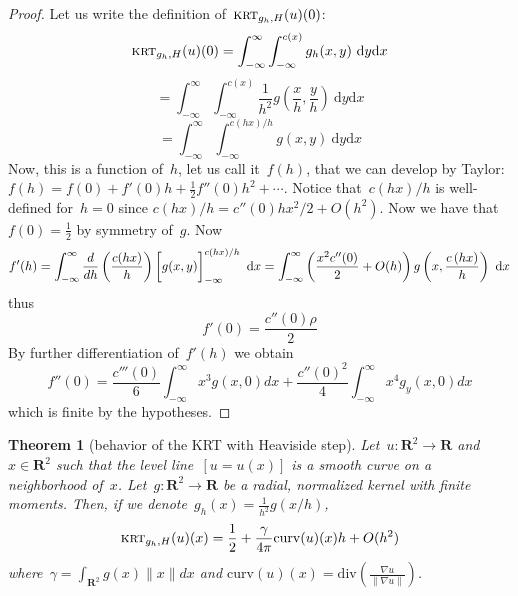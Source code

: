 \documentclass[12pt]{article}                  %
\newtheorem{theorem}{Theorem}
\begin{document}
\begin{proof}
	Let us write the definition of~$\textsc{krt}_{g_h,H}(u)(0)$:
	\[
		\textsc{krt}_{g_h,H}(u)(0)=
		\int_{-\infty}^\infty\int_{-\infty}^{c(x)}
		g_h(x,y)\ %
		\mathrm{d}y
		\mathrm{d}x
	\]
	\[
		=
		\int_{-\infty}^\infty\int_{-\infty}^{c(x)}
		\frac1{h^2}g\left(\frac{x}{h},\frac{y}{h}\right)\ %
		\mathrm{d}y
		\mathrm{d}x
	\]
	\[
		=
		\int_{-\infty}^\infty\int_{-\infty}^{c\left(hx\right)/h}
		g\left(x,y\right)\ %
		\mathrm{d}y
		\mathrm{d}x
	\]
	Now, this is a function of~$h$, let us call it~$f(h)$, that we can
	develop by Taylor:~$f(h)=f(0)+f'(0)h+\frac12f''(0)h^2+\cdots$.
	Notice that~$c(hx)/h$ is well-defined for~$h=0$ since
	$c(hx)/h=c''(0)hx^2/2+O(h^2)$.
	Now we have that~$f(0)=\frac12$ by symmetry of~$g$.  Now
	\[
		f'(h)=
		\int_{-\infty}^\infty \frac{d}{d h}\left(\frac{c(hx)}h\right)
		\left[\vphantom{\int}g(x,y)\right]_{-\infty}^{c(hx)/h}
		\ \mathrm{d}x
		=
		\int_{-\infty}^\infty \left(\frac{x^2c''(0)}2+O(h)\right)
		g\left(x,\frac{c\left(hx\right)}h\right)
		\ \mathrm{d}x
	\]
	thus
	\[
		f'(0)=\frac{c''(0)\rho}2
	\]
	By further differentiation of~$f'(h)$ we obtain
	\[
		f''(0)=
		\frac{c'''(0)}6\int_{-\infty}^\infty x^3g(x,0)dx
		+
		\frac{c''(0)^2}4\int_{-\infty}^\infty x^4g_y(x,0)dx
	\]
	which is finite by the hypotheses.
\end{proof}


\clearpage
\begin{theorem}[behavior of the KRT with Heaviside step]
	\label{thm:krtheaviside}
	Let~$u:\mathbf{R}^2\to\mathbf{R}$ and~$x\in\mathbf{R}^2$ such that
	the level line~$[u=u(x)]$ is a smooth curve on a neighborhood
	of~$x$.  Let~$g:\mathbf{R}^2\to\mathbf{R}$ be a radial,
	normalized kernel with
	finite moments.  Then, if we
	denote~$g_h(x)=\frac{1}{h^2}g(x/h)$,
	\[
		\textsc{krt}_{g_h,H}(u)(x)=\frac12+\frac\gamma{4\pi}\mathrm{curv}(u)(x) h+O(h^2)
	\]
	where~$\gamma=\int_{\mathbf{R}^2}g(x)\|x\|dx$ and
	$\mathrm{curv}(u)(x)=\mathrm{div}\left(\frac{\nabla
	u}{\left\|\nabla u\right\|}\right)$.
\end{theorem}
\end{document}
